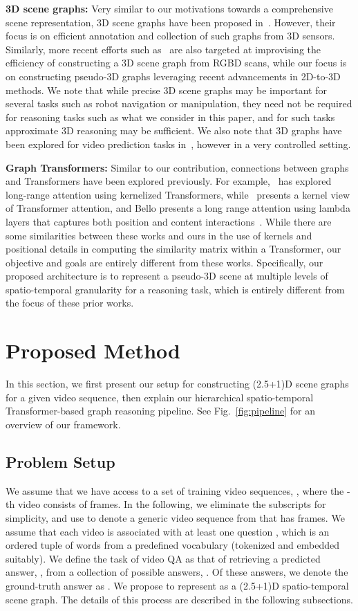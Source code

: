\documentclass[letterpaper]{article} \usepackage{aaai22}  \usepackage{times}  \usepackage{helvet}  \usepackage{courier}  \usepackage[hyphens]{url}  \usepackage{graphicx} \urlstyle{rm} \def\UrlFont{\rm}  \usepackage{natbib}  \usepackage{caption} \DeclareCaptionStyle{ruled}{labelfont=normalfont,labelsep=colon,strut=off} \frenchspacing  \setlength{\pdfpagewidth}{8.5in}  \setlength{\pdfpageheight}{11in}  \usepackage{algorithm}
\newcommand{\name}{(2.5+1)D\xspace}
\begin{document}
\noindent\textbf{3D scene graphs:} Very similar to our motivations towards a comprehensive scene representation, 3D scene graphs have been proposed in~\cite{armeni20193d}. However, their focus is on efficient annotation and collection of such graphs from 3D sensors. Similarly, more recent efforts such as~\cite{zhang2021exploiting,wu2021scenegraphfusion} are also targeted at improvising the efficiency of constructing a 3D scene graph from RGBD scans, while our focus is on constructing pseudo-3D graphs leveraging recent advancements in 2D-to-3D methods. We note that while precise 3D scene graphs may be important for several tasks such as robot navigation or manipulation, they need not be required for reasoning tasks such as what we consider in this paper, and for such tasks approximate 3D reasoning may be sufficient. We also note that 3D graphs have been explored for video prediction tasks in~\cite{tung20203d}, however in a very controlled setting.

\noindent\textbf{Graph Transformers:} Similar to our contribution, connections between graphs and Transformers have been explored previously. For example,~\cite{choromanski2021graph} has explored long-range attention using kernelized Transformers, while~\cite{tsai2019Transformer} presents a kernel view of Transformer attention, and Bello presents a long range attention using lambda layers that captures both position and content interactions~\cite{bello2021lambdanetworks}. While there are some similarities between these works and ours in the use of kernels and positional details in computing the similarity matrix within a Transformer, our objective and goals are entirely different from these works. Specifically, our proposed architecture is to represent a pseudo-3D scene at multiple levels of spatio-temporal granularity for a reasoning task, which is entirely different from the focus of these prior works.
\section{Proposed Method}
In this section, we first present our setup for constructing \name scene graphs for a given video sequence, then explain our hierarchical spatio-temporal Transformer-based graph reasoning pipeline. See Fig.~\ref{fig:pipeline} for an overview of our framework.

\subsection{Problem Setup}
We assume that we have access to a set of  training video sequences, , where the -th video consists of  frames. In the following, we eliminate the subscripts for simplicity, and use  to denote a generic video sequence from  that has  frames. We assume that each video  is associated with at least one question , which is an ordered tuple of words from a predefined vocabulary (tokenized and embedded suitably). We define the task of video QA as that of retrieving a predicted answer, , from a collection of  possible answers, . Of these  answers, we denote the ground-truth answer as . We propose to represent  as a \name spatio-temporal scene graph. The details of this process are described in the following subsections.
\end{document}
